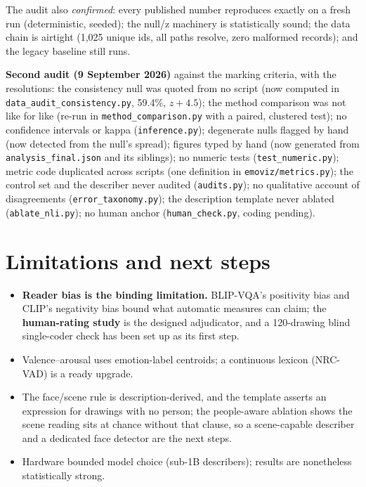 \documentclass[11pt,a4paper]{article}
\begin{document}
The audit also \emph{confirmed}: every published number reproduces exactly on a fresh run
(deterministic, seeded); the null/z machinery is statistically sound; the data chain is airtight
(1{,}025 unique ids, all paths resolve, zero malformed records); and the legacy baseline still runs.

\textbf{Second audit (9 September 2026)} against the marking criteria, with the resolutions:
the consistency null was quoted from no script (now computed in \texttt{data\_audit\_consistency.py},
59.4\%, $z{+}4.5$); the method comparison was not like for like (re-run in
\texttt{method\_comparison.py} with a paired, clustered test); no confidence intervals or kappa
(\texttt{inference.py}); degenerate nulls flagged by hand (now detected from the null's spread);
figures typed by hand (now generated from \texttt{analysis\_final.json} and its siblings); no numeric
tests (\texttt{test\_numeric.py}); metric code duplicated across scripts (one definition in
\texttt{emoviz/metrics.py}); the control set and the describer never audited (\texttt{audits.py});
no qualitative account of disagreements (\texttt{error\_taxonomy.py}); the description template never
ablated (\texttt{ablate\_nli.py}); no human anchor (\texttt{human\_check.py}, coding pending).

\section{Limitations and next steps}
\begin{itemize}
\item \textbf{Reader bias is the binding limitation.} BLIP-VQA's positivity bias and CLIP's negativity
bias bound what automatic measures can claim; the \textbf{human-rating study} is the designed
adjudicator, and a 120-drawing blind single-coder check has been set up as its first step.
\item Valence--arousal uses emotion-label centroids; a continuous lexicon (NRC-VAD) is a ready upgrade.
\item The face/scene rule is description-derived, and the template asserts an expression for drawings
with no person; the people-aware ablation shows the scene reading sits at chance without that clause,
so a scene-capable describer and a dedicated face detector are the next steps.
\item Hardware bounded model choice (sub-1B describers); results are nonetheless statistically strong.
\end{itemize}
\end{document}

